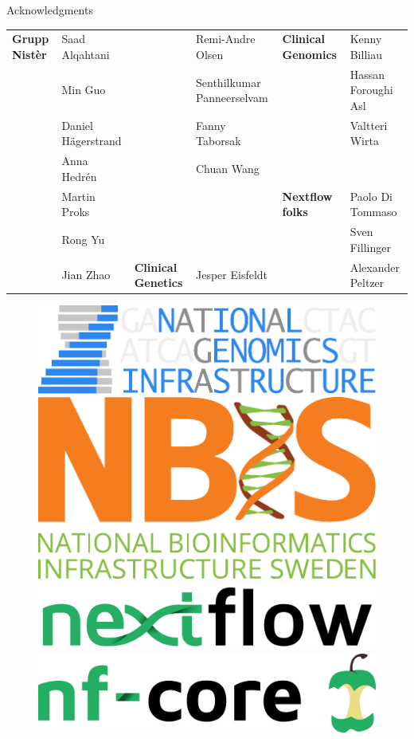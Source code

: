 \documentclass[usepdftitle=false]{beamer}
\begin{document}
\begin{frame}{Acknowledgments}
\begin{table}
{\begin{tabular}{llllll}
		\textbf{Grupp Nistèr}	&	Saad Alqahtani			&														&	Remi-Andre Olsen						&	\textbf{Clinical Genomics}	&	Kenny Billiau\\
													&	Min Guo							&														&	Senthilkumar Panneerselvam	&															&	Hassan Foroughi Asl\\
													&	Daniel Hägerstrand	&														&	Fanny Taborsak							&															&	Valtteri Wirta\\
													&	Anna Hedrén					&														&	Chuan Wang									&															&	\\
													&	Martin Proks				&									&							&	\textbf{Nextflow folks}	&	Paolo Di Tommaso	\\
													&	Rong Yu							&									&							&													&	Sven Fillinger	\\
													&	Jian Zhao						&	\textbf{Clinical Genetics}		&	Jesper Eisfeldt			&		&	Alexander Peltzer	\\
		\end{tabular}}
	\end{table}
	\begin{figure}
		\includegraphics[height=.6cm]{pictures/NGI}%
		\hfill%
		\includegraphics[height=.6cm]{pictures/NBIS}%
		\hfill%
		\includegraphics[height=.6cm]{pictures/nextflow.png}%
		\hfill%
		\includegraphics[height=.6cm]{pictures/nf-core}%
	\end{figure}
\end{frame}
\end{document}
